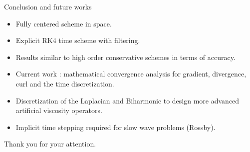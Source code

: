 \documentclass[11pt]{beamer}
\begin{document}

\begin{frame}{Conclusion and future works}
\begin{itemize}
\item Fully centered scheme in space.
\item Explicit RK4 time scheme with filtering.
\item Results similar to high order conservative schemes in terms of accuracy.
\item Current work : mathematical convergence analysis for gradient, divergence, curl and the time discretization.
\item Discretization of the Laplacian and Biharmonic to design more advanced artificial viscosity operators.
\item Implicit time stepping required for slow wave problems (Rossby).
\end{itemize}
\end{frame}


\begin{frame}
\begin{center}
Thank you for your attention.
\end{center}
\end{frame}
\end{document}
